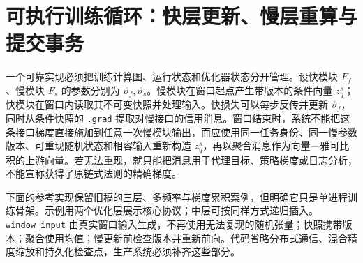 \section{可执行训练循环：快层更新、慢层重算与提交事务}
\label{sec:app_pytorch_implementation}

一个可靠实现必须把训练计算图、运行状态和优化器状态分开管理。设快模块 $F_f$、慢模块 $F_s$ 的参数分别为 $\vartheta_f,\vartheta_s$。慢模块在窗口起点产生带版本的条件向量 $z_q^s$；快模块在窗口内读取其不可变快照并处理输入。快损失可以每步反传并更新 $\vartheta_f$，同时从条件快照的 \texttt{.grad} 提取对慢接口的信用消息。窗口结束时，系统不能把这条接口梯度直接施加到任意一次慢模块输出，而应使用同一任务身份、同一慢参数版本、可重现随机状态和相容输入重新构造 $z_q^s$，再以聚合消息作为向量—雅可比积的上游向量。若无法重现，就只能把消息用于代理目标、策略梯度或日志分析，不能宣称获得了原链式法则的精确梯度。

下面的参考实现保留旧稿的三层、多频率与梯度累积案例，但明确它只是单进程训练骨架。示例用两个优化层展示核心协议；中层可按同样方式递归插入。\texttt{window\_input} 由真实窗口输入生成，不再使用无法复现的随机张量；快照携带版本；聚合使用均值；慢更新前检查版本并重新前向。代码省略分布式通信、混合精度缩放和持久化检查点，生产系统必须补齐这些部分。

